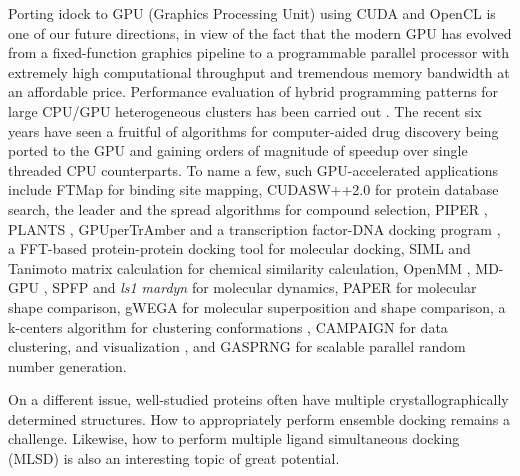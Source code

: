 Porting idock to GPU (Graphics Processing Unit) using CUDA and OpenCL is one of our future directions, in view of the fact that the modern GPU has evolved from a fixed-function graphics pipeline to a programmable parallel processor with extremely high computational throughput and tremendous memory bandwidth at an affordable price. Performance evaluation of hybrid programming patterns for large CPU/GPU heterogeneous clusters has been carried out \citep{1035}. The recent six years have seen a fruitful of algorithms for computer-aided drug discovery being ported to the GPU and gaining orders of magnitude of speedup over single threaded CPU counterparts. To name a few, such GPU-accelerated applications include FTMap \citep{722} for binding site mapping, CUDASW++2.0 \citep{189} for protein database search, the leader and the spread algorithms \citep{750} for compound selection, PIPER \citep{723}, PLANTS \citep{779}, GPUperTrAmber \citep{1270} and a transcription factor-DNA docking program \citep{1267,1266}, a FFT-based protein-protein docking tool \citep{242,652} for molecular docking, SIML \citep{726} and Tanimoto matrix calculation \citep{881} for chemical similarity calculation, OpenMM \citep{373}, MD-GPU \citep{374}, SPFP \citep{1261} and \textit{ls1 mardyn} \citep{1488} for molecular dynamics, PAPER \citep{491} for molecular shape comparison, gWEGA \citep{1388} for molecular superposition and shape comparison, a k-centers algorithm for clustering conformations \citep{1275}, CAMPAIGN \citep{932} for data clustering, and visualization \citep{986}, and GASPRNG \citep{1401} for scalable parallel random number generation.

On a different issue, well-studied proteins often have multiple crystallographically determined structures. How to appropriately perform ensemble docking \citep{966,547,1128} remains a challenge. Likewise, how to perform multiple ligand simultaneous docking (MLSD) \citep{869,1292} is also an interesting topic of great potential.

\chapterend
